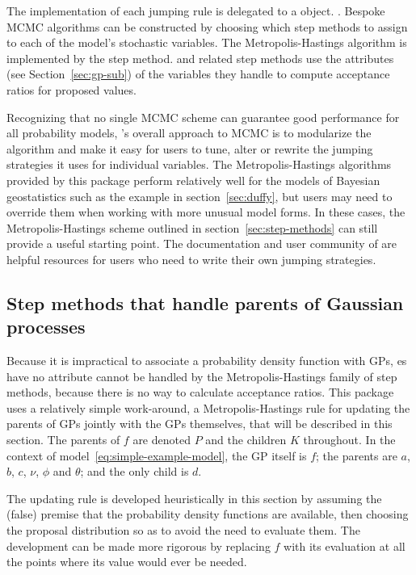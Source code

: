 \documentclass[article]{jss}
\begin{document}
The implementation of each jumping rule is delegated to a  object. \citep{pymc}. Bespoke MCMC algorithms can be constructed by choosing which step methods to assign to each of the model's stochastic variables. The Metropolis-Hastings algorithm is implemented by the  step method.  and related step methods use the  attributes (see Section~\ref{sec:gp-sub}) of the variables they handle to compute acceptance ratios for proposed values. 

\bigskip
Recognizing that no single MCMC scheme can guarantee good performance for all probability models, 's overall approach to MCMC is to modularize the algorithm and make it easy for users to tune, alter or rewrite the jumping strategies it uses for individual variables. The Metropolis-Hastings algorithms provided by this package perform relatively well for the models of Bayesian geostatistics such as the example in section~\ref{sec:duffy}, but users may need to override them when working with more unusual model forms. In these cases, the Metropolis-Hastings scheme outlined in section~\ref{sec:step-methods} can still provide a useful starting point. The documentation and user community of  are helpful resources for users who need to write their own jumping strategies. 



\subsection{Step methods that handle parents of Gaussian processes}
Because it is impractical to associate a probability density function with GPs, es have no  attribute cannot be handled by the Metropolis-Hastings family of step methods, because there is no way to calculate acceptance ratios. This package uses a relatively simple work-around, a Metropolis-Hastings rule for updating the parents of GPs jointly with the GPs themselves, that will be described in this section. The parents of $f$ are denoted $P$ and the children $K$ throughout. In the context of model~\ref{eq:simple-example-model}, the GP itself is $f$; the parents are $a$, $b$, $c$, $\nu$, $\phi$ and $\theta$; and the only child is $d$.

The updating rule is developed heuristically in this section by assuming the (false) premise that the probability density functions are available, then choosing the proposal distribution so as to avoid the need to evaluate them. The development can be made more rigorous by replacing $f$ with its evaluation at all the points where its value would ever be needed.
\end{document}
